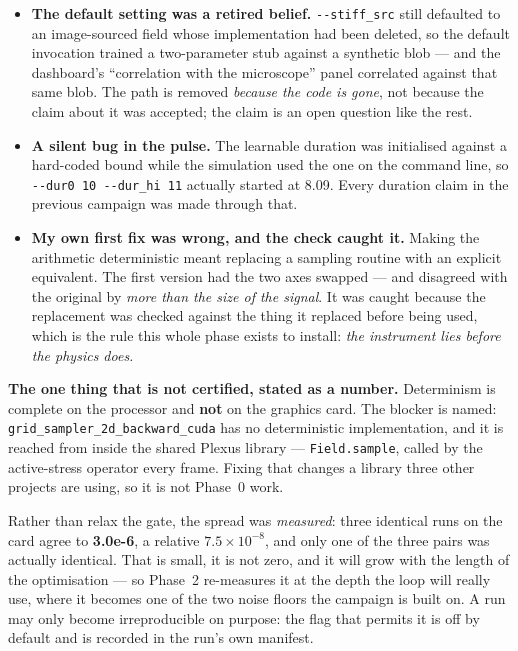 \documentclass[11pt,a4paper]{article}
\newcommand{\code}[1]{\texttt{#1}}
\begin{document}
\begin{itemize}
\item \textbf{The default setting was a retired belief.} \code{-{}-stiff\_src} still defaulted to
an image-sourced field whose implementation had been deleted, so the default invocation trained a
two-parameter stub against a synthetic blob --- and the dashboard's ``correlation with the
microscope'' panel correlated against that same blob. The path is removed \emph{because the code
is gone}, not because the claim about it was accepted; the claim is an open question like the
rest.
\item \textbf{A silent bug in the pulse.} The learnable duration was initialised against a
hard-coded bound while the simulation used the one on the command line, so
\code{-{}-dur0 10 -{}-dur\_hi 11} actually started at 8.09. Every duration claim in the previous
campaign was made through that.
\item \textbf{My own first fix was wrong, and the check caught it.} Making the arithmetic
deterministic meant replacing a sampling routine with an explicit equivalent. The first version
had the two axes swapped --- and disagreed with the original by \emph{more than the size of the
signal}. It was caught because the replacement was checked against the thing it replaced before
being used, which is the rule this whole phase exists to install: \emph{the instrument lies before
the physics does.}
\end{itemize}

\textbf{The one thing that is not certified, stated as a number.} Determinism is complete on the
processor and \textbf{not} on the graphics card. The blocker is named:
\code{grid\_sampler\_2d\_backward\_cuda} has no deterministic implementation, and it is reached
from inside the shared Plexus library --- \code{Field.sample}, called by the active-stress
operator every frame. Fixing that changes a library three other projects are using, so it is not
Phase~0 work.

Rather than relax the gate, the spread was \emph{measured}: three identical runs on the card agree
to \textbf{3.0e-6}, a relative $7.5 \times 10^{-8}$, and only one of the three pairs was actually
identical. That is small, it is not zero, and it will grow with the length of the optimisation ---
so Phase~2 re-measures it at the depth the loop will really use, where it becomes one of the two
noise floors the campaign is built on. A run may only become irreproducible on purpose: the flag
that permits it is off by default and is recorded in the run's own manifest.
\end{document}
